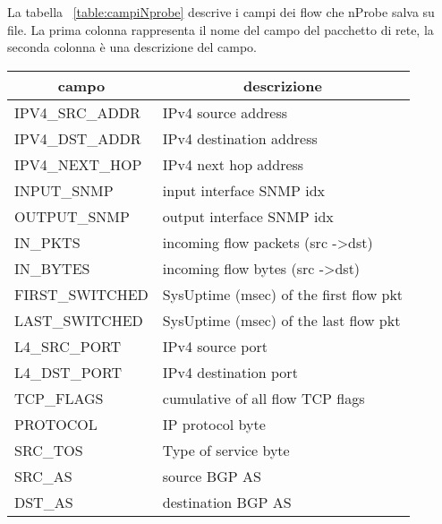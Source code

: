 \documentclass[../main.tex]{subfiles}
\begin{document}
La tabella ~\ref{table:campiNprobe} descrive i campi dei flow che nProbe salva su file. La prima colonna rappresenta il nome del campo del pacchetto di rete, la seconda colonna è una descrizione del campo.

\begin{table}[H]
				\centering
\begin{tabular}{|l|l|}
\hline
\multicolumn{1}{|c|}{\textbf{campo}} & \multicolumn{1}{c|}{\textbf{descrizione}}     \\ \hline
IPV4\_SRC\_ADDR                      & IPv4 source address                           \\ \hline
IPV4\_DST\_ADDR                      & IPv4 destination address                      \\ \hline
IPV4\_NEXT\_HOP                      & IPv4 next hop address                         \\ \hline
INPUT\_SNMP                          & input interface SNMP idx                      \\ \hline
OUTPUT\_SNMP                         & output interface SNMP idx                     \\ \hline
IN\_PKTS                             & incoming flow packets (src -\textgreater dst) \\ \hline
IN\_BYTES                            & incoming flow bytes (src -\textgreater dst)   \\ \hline
FIRST\_SWITCHED                      & SysUptime (msec) of the first flow pkt        \\ \hline
LAST\_SWITCHED                       & SysUptime (msec) of the last flow pkt         \\ \hline
L4\_SRC\_PORT                        & IPv4 source port                              \\ \hline
L4\_DST\_PORT                        & IPv4 destination port                         \\ \hline
TCP\_FLAGS                           & cumulative of all flow TCP flags              \\ \hline
PROTOCOL                             & IP protocol byte                              \\ \hline
SRC\_TOS                             & Type of service byte                          \\ \hline
SRC\_AS                              & source BGP AS                                 \\ \hline
DST\_AS                              & destination BGP AS                            \\ \hline

\end{tabular}
\end{table}
\end{document}
